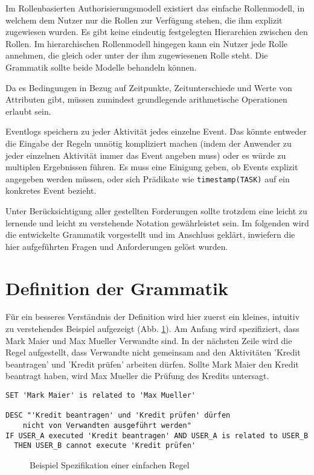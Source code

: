 Im Rollenbasierten Authorisierungsmodell existiert das einfache Rollenmodell, in welchem dem Nutzer nur die Rollen zur Verfügung stehen, die ihm explizit zugewiesen wurden. Es gibt keine eindeutig festgelegten Hierarchien zwischen den Rollen. Im hierarchischen Rollenmodell hingegen kann ein Nutzer jede Rolle annehmen, die gleich oder unter der ihm zugewiesenen Rolle steht. Die Grammatik sollte beide Modelle behandeln können.

Da es Bedingungen in Bezug auf Zeitpunkte, Zeitunterschiede und Werte von Attributen gibt, müssen zumindest grundlegende arithmetische Operationen erlaubt sein.

Eventlogs speichern zu jeder Aktivität jedes einzelne Event. Das könnte entweder die Eingabe der Regeln unnötig kompliziert machen (indem der Anwender zu jeder einzelnen Aktivität immer das Event angeben muss) oder es würde zu multiplen Ergebnissen führen. Es muss eine Einigung geben, ob Events explizit angegeben werden müssen, oder sich Prädikate wie \texttt{timestamp(TASK)} auf ein konkretes Event bezieht.

Unter Berücksichtigung aller gestellten Forderungen sollte trotzdem eine leicht zu lernende und leicht zu verstehende Notation gewährleistet sein. Im folgenden wird die entwickelte Grammatik vorgestellt und im Anschluss geklärt, inwiefern die hier aufgeführten Fragen und Anforderungen gelöst wurden.
%
%
\section{Definition der Grammatik}
Für ein besseres Verständnis der Definition wird hier zuerst ein kleines, intuitiv zu verstehendes Beispiel aufgezeigt (Abb. \ref{fig:demorulefile}). Am Anfang wird spezifiziert, dass Mark Maier und Max Mueller Verwandte sind. In der nächsten Zeile wird die Regel aufgestellt, dass Verwandte nicht gemeinsam and den Aktivitäten 'Kredit beantragen' und 'Kredit prüfen' arbeiten dürfen. Sollte Mark Maier den Kredit beantragt haben, wird Max Mueller die Prüfung des Kredits untersagt.\\

\begin{verbatim}
SET 'Mark Maier' is related to 'Max Mueller'

DESC "'Kredit beantragen' und 'Kredit prüfen' dürfen 
	nicht von Verwandten ausgeführt werden"
IF USER_A executed 'Kredit beantragen' AND USER_A is related to USER_B
  THEN USER_B cannot execute 'Kredit prüfen'
\end{verbatim}
\begin{figure}[!h]
\caption{Beispiel Spezifikation einer einfachen Regel}
\label{fig:demorulefile}
\end{figure}


